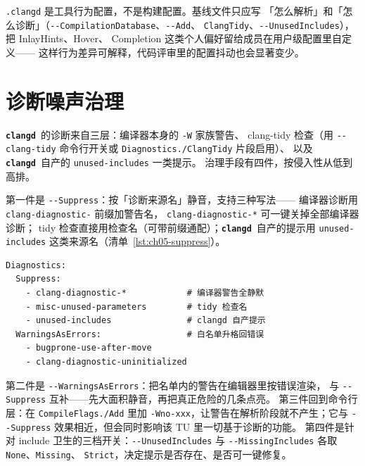 \documentclass[12pt,a4paper,fontset=fandol]{ctexbook}
\newcommand{\Opt}[1]{\texttt{-\/-#1}}
\newcommand{\Bk}{\discretionary{}{}{}}
\newcommand{\Lib}[1]{\textbf{\texttt{#1}}}
\newcommand{\CD}{\Lib{clangd}}
\begin{document}
\begin{bestpractice}[title={团队基线只放 CompileFlags 与 Diagnostics}]
\texttt{.clangd} 是工具行为配置，不是构建配置。基线文件只应写
「怎么解析」和「怎么诊断」（\Opt{CompilationDatabase}、\Opt{Add}、
\texttt{ClangTidy}、\Opt{UnusedIncludes}），把 InlayHints、Hover、
Completion 这类个人偏好留给成员在用户级配置里自定义——
这样行为差异可解释，代码评审里的配置抖动也会显著变少。
\end{bestpractice}

\section{诊断噪声治理}\label{sec:ch05-s4}

\CD\ 的诊断来自三层：编译器本身的 \texttt{-W} 家族警告、
clang-tidy 检查（用 \Opt{clang-tidy} 命令行开关或
\texttt{Diagnostics./}\hspace{0pt}\texttt{ClangTidy} 片段启用）、
以及 \CD\ 自产的 \texttt{unused-{\Bk}includes} 一类提示。
治理手段有四件，按侵入性从低到高排。

第一件是 \Opt{Suppress}：按「诊断来源名」静音，支持三种写法——
编译器诊断用 \texttt{clang-diagnostic-} 前缀加警告名，
\texttt{clang-diagnostic-*} 可一键关掉全部编译器诊断；
tidy 检查直接用检查名（可带前缀通配）；\CD\ 自产的提示用
\texttt{unused-includes} 这类来源名（清单~\ref{lst:ch05-suppress}）。

\begin{lstlisting}[style=yamlstyle,caption={Suppress 与 WarningsAsErrors 配合},label={lst:ch05-suppress}]
Diagnostics:
  Suppress:
    - clang-diagnostic-*            # 编译器警告全静默
    - misc-unused-parameters        # tidy 检查名
    - unused-includes               # clangd 自产提示
  WarningsAsErrors:                 # 白名单升格回错误
    - bugprone-use-after-move
    - clang-diagnostic-uninitialized
\end{lstlisting}

第二件是 \Opt{Warnings{\Bk}As{\Bk}Errors}：把名单内的警告在编辑器里按错误渲染，
与 \Opt{Suppress} 互补——先大面积静音，再把真正危险的几条点亮。
第三件回到命令行层：在 \texttt{Compile{\Bk}Flags./}\hspace{0pt}\texttt{Add} 里加
\texttt{-Wno-xxx}，让警告在解析阶段就不产生；它与 \Opt{Suppress}
效果相近，但会同时影响该 TU 里一切基于诊断的功能。
第四件是针对 include 卫生的三档开关：\Opt{Unused{\Bk}Includes} 与
\Opt{Missing{\Bk}Includes} 各取 \texttt{None}、\texttt{Missing}、
\texttt{Strict}，决定提示是否存在、是否可一键修复。
\end{document}

